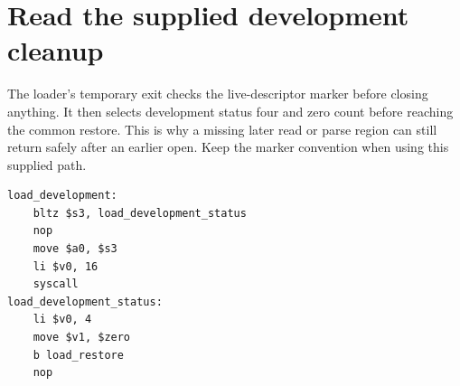 \section{Read the supplied development cleanup}
The loader's temporary exit checks the live-descriptor marker before closing anything.
It then selects development status four and zero count before reaching the common
restore. This is why a missing later read or parse region can still return safely
after an earlier open. Keep the marker convention when using this supplied path.

\begin{verbatim}
load_development:
    bltz $s3, load_development_status
    nop
    move $a0, $s3
    li $v0, 16
    syscall
load_development_status:
    li $v0, 4
    move $v1, $zero
    b load_restore
    nop
\end{verbatim}

